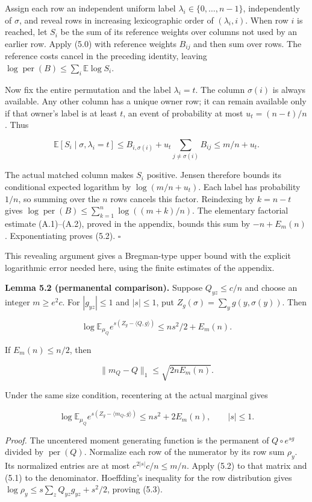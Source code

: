 \documentclass[english,11pt,a4paper]{article}
\begin{document}
Assign each row an independent uniform label \(\lambda_i\in\{0,\ldots,n-1\}\), independently of \(\sigma\), and reveal rows in increasing lexicographic order of \((\lambda_i,i)\). When row \(i\) is reached, let \(S_i\) be the sum of its reference weights over columns not used by an earlier row. Apply (5.0) with reference weights \(B_{ij}\) and then sum over rows. The reference costs cancel in the preceding identity, leaving \(\log\operatorname{per}(B)\le\sum_i\mathbb E\log S_i\).

Now fix the entire permutation and the label \(\lambda_i=t\). The column \(\sigma(i)\) is always available. Any other column has a unique owner row; it can remain available only if that owner's label is at least \(t\), an event of probability at most \(u_t=(n-t)/n\). Thus

\nopagebreak[4]
\[\mathbb E[S_i\mid\sigma,\lambda_i=t]
\le B_{i,\sigma(i)}+u_t\sum_{j\ne\sigma(i)}B_{ij}
\le m/n+u_t.\tag{5.2a}\]

The actual matched column makes \(S_i\) positive. Jensen therefore bounds its conditional expected logarithm by \(\log(m/n+u_t)\). Each label has probability \(1/n\), so summing over the \(n\) rows cancels this factor. Reindexing by \(k=n-t\) gives \(\log\operatorname{per}(B)\le\sum_{k=1}^n\log((m+k)/n)\). The elementary factorial estimate (A.1)--(A.2), proved in the appendix, bounds this sum by \(-n+E_m(n)\). Exponentiating proves (5.2). \(\square\)

This revealing argument gives a Bregman-type upper bound with the explicit logarithmic error needed here, using the finite estimates of the appendix.

\textbf{Lemma 5.2 (permanental comparison).} Suppose \(Q_{yz}\le c/n\) and choose an integer \(m\ge e^2c\). For \(|g_{yz}|\le1\) and \(|s|\le1\), put \(Z_g(\sigma)=\sum_yg(y,\sigma(y))\). Then

\nopagebreak[4]
\[\log\mathbb E_{\mu_Q}e^{s(Z_g-\langle Q,g\rangle)}
\le ns^2/2+E_m(n).\tag{5.3}\]

If \(E_m(n)\le n/2\), then

\nopagebreak[4]
\[\|m_Q-Q\|_1\le\sqrt{2nE_m(n)}.\tag{5.4}\]

Under the same size condition, recentering at the actual marginal gives

\nopagebreak[4]
\[\log\mathbb E_{\mu_Q}e^{s(Z_g-\langle m_Q,g\rangle)}
\le ns^2+2E_m(n),\qquad |s|\le1.\tag{5.5}\]

\emph{Proof.} The uncentered moment generating function is the permanent of \(Q\circ e^{sg}\) divided by \(\operatorname{per}(Q)\). Normalize each row of the numerator by its row sum \(\rho_y\). Its normalized entries are at most \(e^{2|s|}c/n\le m/n\). Apply (5.2) to that matrix and (5.1) to the denominator. Hoeffding's inequality for the row distribution gives \(\log\rho_y\le s\sum_zQ_{yz}g_{yz}+s^2/2\), proving (5.3).
\end{document}
